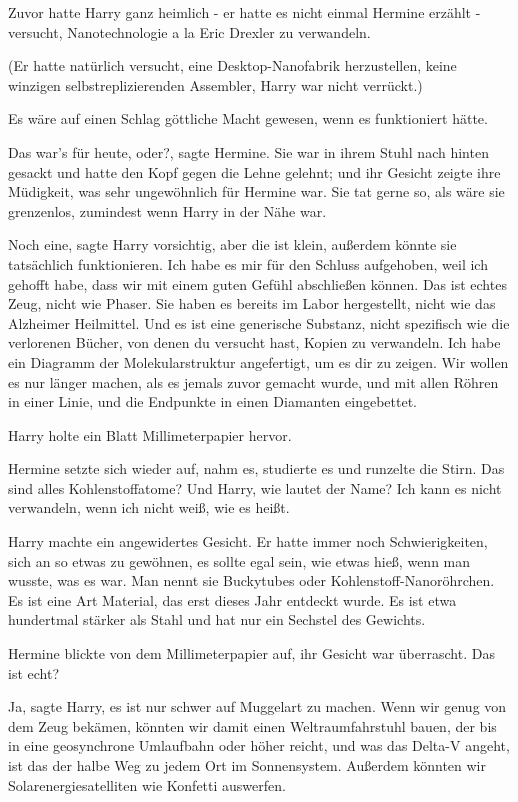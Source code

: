 Zuvor hatte Harry ganz heimlich - er hatte es nicht einmal Hermine erzählt -
versucht, Nanotechnologie a la Eric Drexler zu verwandeln.

(Er hatte natürlich versucht, eine Desktop-Nanofabrik herzustellen, keine
winzigen selbstreplizierenden Assembler, Harry war nicht verrückt.)

Es wäre auf einen Schlag göttliche Macht gewesen, wenn es funktioniert hätte.

\glqq Das war's für heute, oder?\grqq{}, sagte Hermine. Sie war in ihrem Stuhl
nach hinten gesackt und hatte den Kopf gegen die Lehne gelehnt; und ihr Gesicht
zeigte ihre Müdigkeit, was sehr ungewöhnlich für Hermine war. Sie tat gerne so,
als wäre sie grenzenlos, zumindest wenn Harry in der Nähe war.

\glqq Noch eine\grqq{}, sagte Harry vorsichtig, \glqq aber die ist klein,
außerdem könnte sie tatsächlich funktionieren. Ich habe es mir für den Schluss
aufgehoben, weil ich gehofft habe, dass wir mit einem guten Gefühl abschließen
können. Das ist echtes Zeug, nicht wie Phaser. Sie haben es bereits im Labor
hergestellt, nicht wie das Alzheimer Heilmittel. Und es ist eine generische
Substanz, nicht spezifisch wie die verlorenen Bücher, von denen du versucht
hast, Kopien zu verwandeln. Ich habe ein Diagramm der Molekularstruktur
angefertigt, um es dir zu zeigen. Wir wollen es nur länger machen, als es jemals
zuvor gemacht wurde, und mit allen Röhren in einer Linie, und die Endpunkte in
einen Diamanten eingebettet.\grqq{}

Harry holte ein Blatt Millimeterpapier hervor.

Hermine setzte sich wieder auf, nahm es, studierte es und runzelte die Stirn.
\glqq Das sind alles Kohlenstoffatome? Und Harry, wie lautet der Name? Ich kann
es nicht verwandeln, wenn ich nicht weiß, wie es heißt.\grqq{}

Harry machte ein angewidertes Gesicht. Er hatte immer noch Schwierigkeiten, sich
an so etwas zu gewöhnen, es sollte egal sein, wie etwas hieß, wenn man wusste,
was es war. \glqq Man nennt sie Buckytubes oder Kohlenstoff-Nanoröhrchen. Es ist
eine Art Material, das erst dieses Jahr entdeckt wurde. Es ist etwa hundertmal
stärker als Stahl und hat nur ein Sechstel des Gewichts.\grqq{}

Hermine blickte von dem Millimeterpapier auf, ihr Gesicht war überrascht. \glqq
Das ist echt?\grqq{}

\glqq Ja\grqq{}, sagte Harry, \glqq es ist nur schwer auf Muggelart zu machen.
Wenn wir genug von dem Zeug bekämen, könnten wir damit einen Weltraumfahrstuhl
bauen, der bis in eine geosynchrone Umlaufbahn oder höher reicht, und was das
Delta-V angeht, ist das der halbe Weg zu jedem Ort im Sonnensystem. Außerdem
könnten wir Solarenergiesatelliten wie Konfetti auswerfen.\grqq{}

